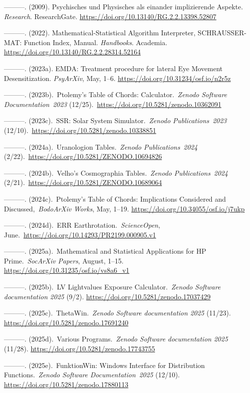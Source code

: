 \documentclass[
]{article}
\begin{document}
---------. (2009). Psychisches und Physisches als einander implizierende
Aspekte. \emph{Research}. ResearchGate.
\url{https://doi.org/10.13140/RG.2.2.13398.52807}

---------. (2022). Mathematical-Statistical Algorithm Interpreter,
SCHRAUSSER-MAT: Function Index, Manual. \emph{Handbooks}. Academia.
\url{https://doi.org/10.13140/RG.2.2.28314.52164}

---------. (2023a). EMDA: Treatment procedure for lateral Eye Movement
Desensitization. \emph{PsyArXiv}, May, 1--6.
\url{https://doi.org/10.31234/osf.io/n2r5z}

---------. (2023b).~Ptolemy's Table of Chords: Calculator.~\emph{Zenodo
Software Documentation~2023}
(12/25).~\url{https://doi.org/10.5281/zenodo.10362091}

---------. (2023c).~SSR: Solar System Simulator.~\emph{Zenodo
Publications~2023}
(12/10).~\url{https://doi.org/10.5281/zenodo.10338851}

---------. (2024a).~Uranologion Tables.~\emph{Zenodo Publications~2024}
(2/22).~\url{https://doi.org/10.5281/ZENODO.10694826}

---------. (2024b).~Velho's Cosmographia Tables.~\emph{Zenodo
Publications~2024} (2/21).~\url{https://doi.org/10.5281/ZENODO.10689064}

---------. (2024c).~Ptolemy's Table of Chords: Implications Considered
and Discussed,~\emph{BodoArXiv Works}, May, 1--19.
\url{https://doi.org/10.34055/osf.io/j7ukp}

---------. (2024d).~ERR Earthrotation.~\emph{ScienceOpen},
June.~\url{https://doi.org/10.14293/PR2199.000905.v1}

---------. (2025a).~Mathematical and Statistical Applications for HP
Prime.~\emph{SocArXiv Papers}, August, 1--15.
\url{https://doi.org/10.31235/osf.io/vs8a6_v1}

---------. (2025b).~LV Lightvalues Exposure Calculator.~\emph{Zenodo
Software documentation 2025} (9/2).
\url{https://doi.org/10.5281/zenodo.17037429}

---------. (2025c).~ThetaWin.~\emph{Zenodo Software documentation 2025}
(11/23). \url{https://doi.org/10.5281/zenodo.17691240}

---------. (2025d).~Various Programs.~\emph{Zenodo Software
documentation 2025} (11/28).
\url{https://doi.org/10.5281/zenodo.17743755}

---------. (2025e).~FunktionWin: Windows Interface for Distribution
Functions.~\emph{Zenodo Software Documentation~2025} (12/10).
\url{https://doi.org/10.5281/zenodo.17880113}
\end{document}
